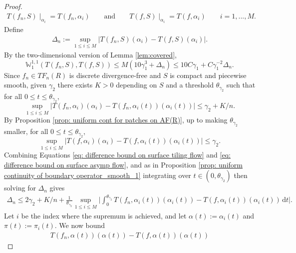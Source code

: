 \documentclass[11pt]{article}
\theoremstyle{remark}
\theoremstyle{definition}
\newcommand{\m}[1]{\mathbb{#1}}
\newcommand{\dd}{\mathrm{d}}
\begin{document}
\begin{proof}
    \begin{align*}
        T(f_n,S)\mid_{\alpha_i} = T(f_n,\alpha_i) \qquad \text{and} \qquad T(f,S)\mid_{\alpha_i} = T(f, \alpha_i) \qquad i=1,...,M.
    \end{align*}
    Define 
    \begin{align*}
        \Delta_n := \sup_{1\leq i \leq M} \bigg\lvert T(f_n,S)(\alpha_i) - T(f,S)(\alpha_i)\bigg\rvert.
    \end{align*}
    By the two-dimensional version of Lemma \ref{lem:covered},
    \begin{equation}\label{eq: tiling vs asymp from lemma 1}
        \m W_1^{1,1}(T(f_n,S),T(f,S)) \leq M(10\gamma_1^3+\Delta_n) \leq 10C \gamma_1 + C\gamma_1^{-2} \Delta_n.
    \end{equation}
    Since $f_n\in TF_n(R)$ is discrete divergence-free and $S$ is compact and piecewise smooth, given $\gamma_2$ there exists $K>0$ depending on $S$ and a threshold $\theta_{\gamma_2}$ such that for all $0\leq t\leq \theta_{\gamma_2}$,
    \begin{equation}\label{eq: difference bound on surface tiling flow}
        \sup_{1\leq i\leq M} \bigg| T(f_n,\alpha_i)(\alpha_i) - T(f_n, \alpha_i(t))(\alpha_i(t))\bigg| \leq \gamma_2 + K/n.
    \end{equation}
    By Proposition \ref{prop: uniform cont for patches on AF(R)}, up to making $\theta_{\gamma_2}$ smaller, for all $0\leq t\leq \theta_{\gamma_2}$,
    \begin{equation}\label{eq: difference bound on surface asymp flow}
        \sup_{1\leq i\leq M} \bigg| T(f,\alpha_i)(\alpha_i) - T(f, \alpha_i(t))(\alpha_i(t))\bigg| \leq \gamma_2.
    \end{equation}
    Combining Equations \eqref{eq: difference bound on surface tiling flow} and \eqref{eq: difference bound on surface asymp flow}, and as in Proposition \ref{prop: uniform continuity of boundary operator_smooth_1} integrating over $t\in (0,\theta_{\gamma_2})$ then solving for $\Delta_n$ gives 
    \begin{align*}
        \Delta_n \leq 2 \gamma_2 + K/n + \frac{1}{\theta_{\gamma_2}} \sup_{1\leq i\leq M} \bigg|\int_{0}^{\theta_{\gamma_2}} T(f_n,\alpha_i(t))(\alpha_i(t))- T(f,\alpha_i(t))(\alpha_i(t))\, \dd t \bigg|.
    \end{align*}
    Let $i$ be the index where the supremum is achieved, and let $\alpha(t):=\alpha_i(t)$ and $\pi(t):=\pi_i(t)$. We now bound 
    \begin{align*}
        T(f_n,\alpha(t))(\alpha(t))- T(f,\alpha(t))(\alpha(t))

\end{align*}
\end{proof}
\end{document}

